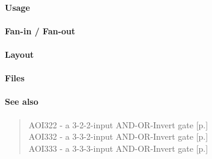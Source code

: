 \paragraph{Usage}

\paragraph{Fan-in / Fan-out}

\paragraph{Layout}

\paragraph{Files}

\paragraph{See also}
\begin{quote}
    AOI322 - a 3-2-2-input AND-OR-Invert gate [p.\pageref{AOI322}] \\
    AOI332 - a 3-3-2-input AND-OR-Invert gate [p.\pageref{AOI332}] \\
    AOI333 - a 3-3-3-input AND-OR-Invert gate [p.\pageref{AOI333}]
\end{quote}
